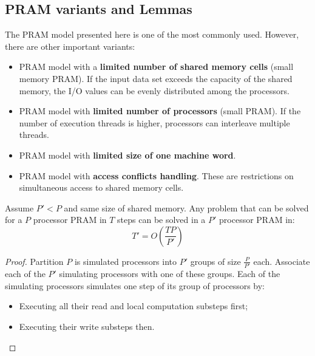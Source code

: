 \subsection{PRAM variants and Lemmas}

The PRAM model presented here is one of the most commonly used. However, there are other important variants:
\begin{itemize}
    \item PRAM model with a \textbf{limited number of shared memory cells} (small memory PRAM). If the input data set exceeds the capacity of the shared memory, the I/O values can be evenly distributed among the processors.
    
    \item PRAM model with \textbf{limited number of processors} (small PRAM). If the number of execution threads is higher, processors can interleave multiple threads.

    \item PRAM model with \textbf{limited size of one machine word}.
    
    \item PRAM model with \textbf{access conflicts handling}. These are restrictions on simultaneous access to shared memory cells.
\end{itemize}

\begin{lemma}
    Assume $P' < P$ and same size of shared memory. Any problem that can be solved for a $P$ processor PRAM in $T$ steps can be solved in a $P'$ processor PRAM in:
    \begin{equation}
        T' = O\left(\dfrac{TP}{P'}\right)
    \end{equation}
\end{lemma}
\begin{proof}
    Partition $P$ is simulated processors into $P'$ groups of size $\frac{P}{P'}$ each. Associate each of the $P'$ simulating processors with one of these groups. Each of the simulating processors simulates one step of its group of processors by:
    \begin{itemize}
        \item Executing all their read and local computation substeps first;
        \item Executing their write substeps then.
    \end{itemize}
\end{proof}

